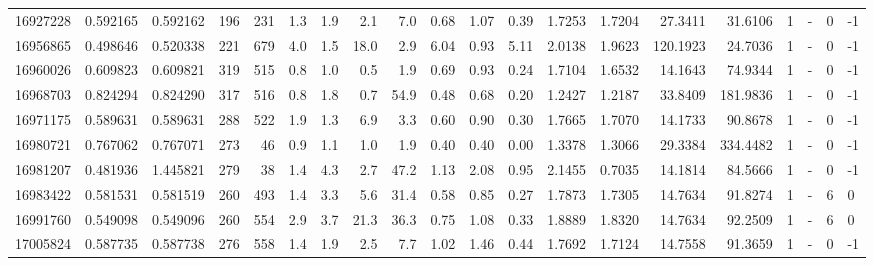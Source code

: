 \begin{tabular}{rrrrrrrrrrrrrrrrrlrl}
  16927228 & 0.592165 &   0.592162 &  196 &  231 &      1.3 &      1.9 &     2.1 &      7.0 &       0.68 &        1.07 &        0.39 &  1.7253 &  1.7204 &   27.3411 &   31.6106 &       1 &             - &        0 &        -1 \\
  16956865 & 0.498646 &   0.520338 &  221 &  679 &      4.0 &      1.5 &    18.0 &      2.9 &       6.04 &        0.93 &        5.11 &  2.0138 &  1.9623 &  120.1923 &   24.7036 &       1 &             - &        0 &        -1 \\
  16960026 & 0.609823 &   0.609821 &  319 &  515 &      0.8 &      1.0 &     0.5 &      1.9 &       0.69 &        0.93 &        0.24 &  1.7104 &  1.6532 &   14.1643 &   74.9344 &       1 &             - &        0 &        -1 \\
  16968703 & 0.824294 &   0.824290 &  317 &  516 &      0.8 &      1.8 &     0.7 &     54.9 &       0.48 &        0.68 &        0.20 &  1.2427 &  1.2187 &   33.8409 &  181.9836 &       1 &             - &        0 &        -1 \\
  16971175 & 0.589631 &   0.589631 &  288 &  522 &      1.9 &      1.3 &     6.9 &      3.3 &       0.60 &        0.90 &        0.30 &  1.7665 &  1.7070 &   14.1733 &   90.8678 &       1 &             - &        0 &        -1 \\
  16980721 & 0.767062 &   0.767071 &  273 &   46 &      0.9 &      1.1 &     1.0 &      1.9 &       0.40 &        0.40 &        0.00 &  1.3378 &  1.3066 &   29.3384 &  334.4482 &       1 &             - &        0 &        -1 \\
  16981207 & 0.481936 &   1.445821 &  279 &   38 &      1.4 &      4.3 &     2.7 &     47.2 &       1.13 &        2.08 &        0.95 &  2.1455 &  0.7035 &   14.1814 &   84.5666 &       1 &             - &        0 &        -1 \\
  16983422 & 0.581531 &   0.581519 &  260 &  493 &      1.4 &      3.3 &     5.6 &     31.4 &       0.58 &        0.85 &        0.27 &  1.7873 &  1.7305 &   14.7634 &   91.8274 &       1 &             - &        6 &         0 \\
  16991760 & 0.549098 &   0.549096 &  260 &  554 &      2.9 &      3.7 &    21.3 &     36.3 &       0.75 &        1.08 &        0.33 &  1.8889 &  1.8320 &   14.7634 &   92.2509 &       1 &             - &        6 &         0 \\
  17005824 & 0.587735 &   0.587738 &  276 &  558 &      1.4 &      1.9 &     2.5 &      7.7 &       1.02 &        1.46 &        0.44 &  1.7692 &  1.7124 &   14.7558 &   91.3659 &       1 &             - &        0 &        -1 \\

\end{tabular}
